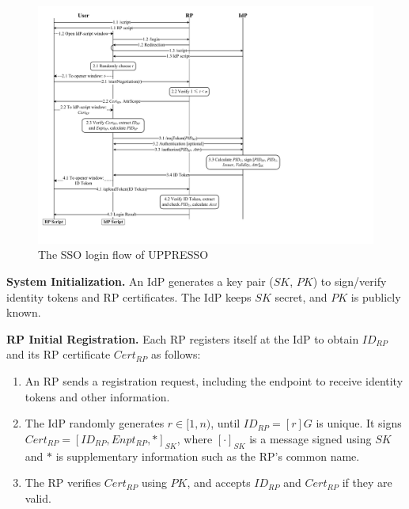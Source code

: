 \begin{figure}[bt]
  \centering
  \includegraphics[height=0.575\textheight]{fig/process-js.pdf}
  \caption{The SSO login flow of UPPRESSO}
  \label{fig:process}
\end{figure}


\noindent \textbf{System Initialization.}
An IdP generates a key pair ($SK$, $PK$) to sign/verify identity tokens and RP certificates.
The IdP keeps $SK$ secret, and $PK$ is publicly known.


\vspace{0.4mm}
\noindent\textbf{RP Initial Registration.}
Each RP registers itself at the IdP to obtain $ID_{RP}$
 and its RP certificate $Cert_{RP}$ as follows:
\vspace{-\topsep}\begin{enumerate}
\setlength{\topsep}{0pt}
\setlength{\partopsep}{0pt}
\setlength{\itemsep}{0pt}
\setlength{\parsep}{0pt}
\setlength{\parskip}{0pt}
\item
An RP sends a registration request, including the endpoint to receive identity tokens
    and other information.
\item
The IdP randomly generates $r \in [1,n)$, until $ID_{RP} = [r]G$ is unique.
It signs $Cert_{RP} = [ID_{RP}, Enpt_{RP}, *]_{SK}$,
     where $[\cdot]_{SK}$ is a message signed using $SK$ and $*$ is supplementary information such as the RP's common name.
\item
The RP verifies $Cert_{RP}$ using $PK$,
    and accepts $ID_{RP}$ and $Cert_{RP}$ if they are valid.
\end{enumerate}

